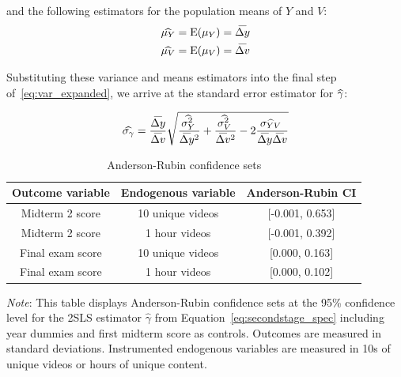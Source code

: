 \documentclass[12pt]{article}
\newcommand\wh[1]{\hstretch{2}{\hat{\hstretch{.5}{#1}}}}
\newcommand\wb[1]{\hstretch{2}{\bar{\hstretch{.5}{#1}}}}
\newcommand{\Fignote}[1]{
	\begin{tablenotes}[para,flushleft]\footnotesize
		\textit{Note}: #1
	\end{tablenotes}
}
\begin{document}
and the following estimators for the population means of $Y$ and $V$:
\begin{equation}
\begin{split}
\wh{\mu_Y} & = \operatorname{E}(\mu_Y) = \wb{\Delta y} \\
\wh{\mu_V} & = \operatorname{E}(\mu_V) = \wb{\Delta v}
\end{split}\label{eq:equation4}
\end{equation}

Substituting these variance and means estimators into the final step of~\ref{eq:var_expanded}, we arrive at the standard error estimator for $\wh{\gamma}$:

\begin{equation}
	\wh{\sigma_{\gamma}} = \frac{\wb{\Delta y}}{\wb{\Delta v}} \sqrt{ \frac{\wh{\sigma_Y^2}}{\wb{\Delta y}^2} + \frac{\wh{\sigma_V^2}}{\wb{\Delta v}^2} - 2 \frac{\wh{\sigma_{YV}}}{\wb{\Delta y} \wb{\Delta v}} }\label{eq:equation5}
\end{equation}

\clearpage


\clearpage


\clearpage
\begin{spacing}{1.0}
\begin{table} \centering \caption{Anderson-Rubin confidence sets}
\label{tab:arci_table}
\begin{threeparttable}
\begin{tabular}{ ccc }
\toprule
Outcome variable & Endogenous variable & Anderson-Rubin CI \\
\midrule
Midterm 2 score & 10 unique videos & [-0.001, 0.653] \\
Midterm 2 score & 1 hour videos & [-0.001, 0.392] \\
Final exam score & 10 unique videos & [0.000, 0.163] \\
Final exam score & 1 hour videos & [0.000, 0.102] \\
\bottomrule
\end{tabular}
\Fignote{This table displays Anderson-Rubin confidence sets at the 95\% confidence level for the 2SLS estimator $\hat{\gamma}$ from Equation~\ref{eq:secondstage_spec} including year dummies and first midterm score as controls. Outcomes are measured in standard deviations. Instrumented endogenous variables are measured in 10s of unique videos or hours of unique content.}
\end{threeparttable}
\end{table}
\end{spacing}
\end{document}

